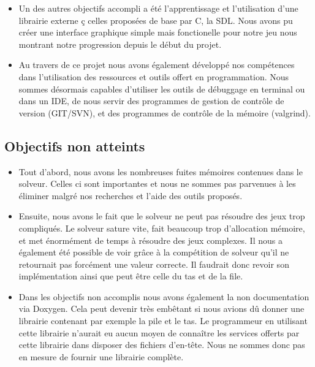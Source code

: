 \documentclass{article}
\begin{document}
\begin{itemize}
\item Un des autres objectifs accompli a été l'apprentissage et l'utilisation d'une librairie externe ç celles proposées de base par C, la SDL. Nous avons pu créer une interface graphique simple mais fonctionelle pour notre jeu nous montrant notre progression depuis le début du projet.\\

\item Au travers de ce projet nous avons également développé nos compétences dans l'utilisation des ressources et outils offert en programmation. Nous sommes désormais capables d'utiliser les outils de débuggage en terminal ou dans un IDE, de nous servir des programmes de gestion de contrôle de version (GIT/SVN), et des programmes de contrôle de la mémoire (valgrind).\newpage
\end{itemize}

\subsection {Objectifs non atteints}
\begin{itemize}
\item Tout d'abord, nous avons les nombreuses fuites mémoires contenues dans le solveur. Celles ci sont importantes et nous ne sommes pas parvenues à les éliminer malgré nos recherches et l'aide des outils proposés.\\

\item Ensuite, nous avons le fait que le solveur ne peut pas résoudre des jeux trop compliqués. Le solveur sature vite, fait beaucoup trop d'allocation mémoire, et met énormément de temps à résoudre des jeux complexes. Il nous a également été possible de voir grâce à la compétition de solveur qu'il ne retournait pas forcément une valeur correcte. Il faudrait donc revoir son implémentation ainsi que peut être celle du tas et de la file.\\

\item Dans les objectifs non accomplis nous avons également la non documentation via Doxygen. Cela peut devenir très embêtant si nous avions dû donner une librairie contenant par exemple la pile et le tas. Le programmeur en utilisant cette librairie n'aurait eu aucun moyen de connaître les services offerts par cette librairie dans disposer des fichiers d'en-tête. Nous ne sommes donc pas en mesure de fournir une librairie complète.   
\end{itemize}
\end{document}
